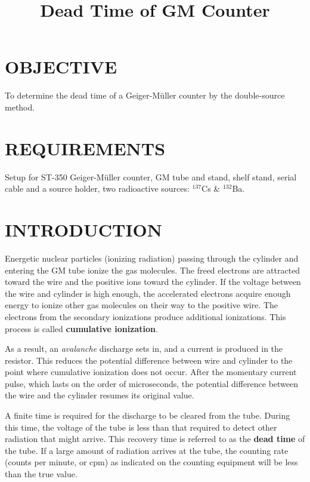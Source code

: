\documentclass[12pt,a4paper]{article}
\title{Dead Time of GM Counter}
\begin{document}
		\maketitle
		
		\section{OBJECTIVE}
			To determine the dead time of a Geiger-M{\"u}ller counter by the double-source method.
			
		\section{REQUIREMENTS}
			Setup for ST-350 Geiger-M{\"u}ller counter, GM tube and stand, shelf stand, serial cable and a source holder, two radioactive sources: $^{137}$Cs \& $^{132}$Ba.
			
		\section{INTRODUCTION}
			
			Energetic nuclear particles (ionizing radiation) passing through the cylinder and entering the GM tube ionize the gas molecules. The freed electrons are attracted toward the wire and the positive ions toward the cylinder. If the voltage between the wire and cylinder is high enough, the accelerated electrons acquire enough energy to ionize other gas molecules on their way to the positive wire. The electrons from the secondary ionizations produce additional ionizations. This process is called \textbf{cumulative ionization}.
			
			As a result, an \emph{avalanche} discharge sets in, and a current is produced in the resistor. This reduces the potential difference between wire and cylinder to the point where cumulative ionization does not occur. After the momentary current pulse, which lasts on the order of microseconds, the potential difference between the wire and the cylinder resumes its original value.
			
			A finite time is required for the discharge to be cleared from the tube. During this time, the voltage of the tube is less than that required to detect other radiation that might arrive. This recovery time is referred to as the \textbf{dead time} of the tube. If a large amount of radiation arrives at the tube, the counting rate (counts per minute, or cpm) as indicated on the counting equipment will be less than the true value.\\
			
\end{document}
